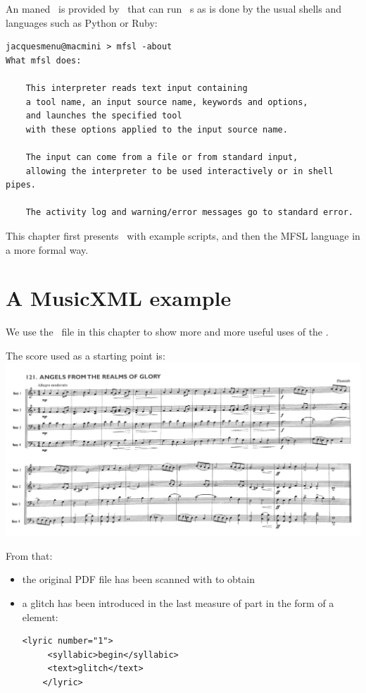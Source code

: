 An  maned \mfslExec\ is provided by \mf\, that can run \mfslLang\ \script s as is done by the usual shells and languages such as Python or Ruby:
\begin{lstlisting}[language=Terminal]
jacquesmenu@macmini > mfsl -about
What mfsl does:

    This interpreter reads text input containing
    a tool name, an input source name, keywords and options,
    and launches the specified tool
    with these options applied to the input source name.

    The input can come from a file or from standard input,
    allowing the interpreter to be used interactively or in shell pipes.

    The activity log and warning/error messages go to standard error.
\end{lstlisting}

This chapter first presents \mfslLang\ with example scripts, and then the MFSL language in a more formal way.


\section{A MusicXML example}

We use the  \mxml\ file in this chapter to show more and more useful uses of the \mfslInterp.

The score used as a starting point is:\\
\includegraphics[scale=0.5]{../graphics/Hymn121_OrigianlScore.png}

From that:
\begin{itemize}
\item the original PDF file has been scanned with  to obtain\\

\item a glitch has been introduced in the last measure of part  in the form of a  element:
\begin{lstlisting}[language=MusicXML]
    <lyric number="1">
     <syllabic>begin</syllabic>
     <text>glitch</text>
    </lyric>
\end{lstlisting}
\end{itemize}



